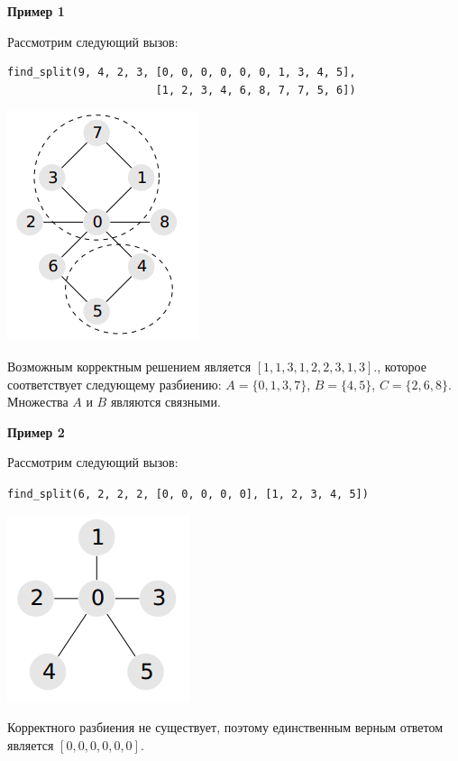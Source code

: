 \textbf{Пример 1}

Рассмотрим следующий вызов:

\begin{verbatim}
find_split(9, 4, 2, 3, [0, 0, 0, 0, 0, 0, 1, 3, 4, 5],
                       [1, 2, 3, 4, 6, 8, 7, 7, 5, 6])
\end{verbatim}

\includegraphics{1.png}

Возможным корректным решением является $[1, 1, 3, 1, 2, 2, 3, 1, 3]$., которое
соответствует следующему разбиению: $A=\{0, 1, 3, 7\}$, $B=\{4, 5\}$, $C=\{2, 6, 8\}$.
Множества $A$ и $B$ являются связными.

\textbf{Пример 2}

Рассмотрим следующий вызов:

\texttt{find\_split(6, 2, 2, 2, [0, 0, 0, 0, 0], [1, 2, 3, 4, 5])}

\includegraphics{2.png}

Корректного разбиения не существует, поэтому единственным верным ответом является $[0, 0, 0, 0, 0, 0]$.
